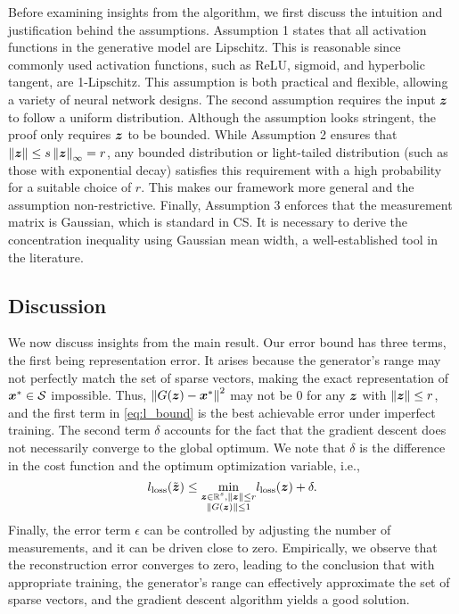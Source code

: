 \documentclass[journal]{IEEEtran}
\begin{document}
Before examining insights from the algorithm, we first discuss the intuition and justification behind the assumptions.  Assumption 1 states that all activation functions in the generative model are Lipschitz. This is reasonable since commonly used activation functions, such as ReLU, sigmoid, and hyperbolic tangent, are 1-Lipschitz. This assumption is both practical and flexible, allowing a variety of neural network designs.  The second assumption requires the input $\boldsymbol{z}$ to follow a uniform distribution. Although the assumption looks stringent, the proof only requires $\boldsymbol{z}$ to be bounded. While Assumption 2 ensures that $\left\Vert\boldsymbol{z}\right\Vert\leq s\left\Vert\boldsymbol{z}\right\Vert_{\infty}=r$, any bounded distribution or light-tailed distribution (such as those with exponential decay) satisfies this requirement with a high probability for a suitable choice of $r$. This makes our framework more general and the assumption non-restrictive.  Finally, Assumption 3 enforces that the measurement matrix is Gaussian, which is standard in CS. It is necessary to derive the concentration inequality using Gaussian mean width, a well-established tool in the literature.  

\subsection{Discussion}
We now discuss insights from the main result. Our error bound has three terms, the first being representation error. It arises because the generator’s range may not perfectly match the set of sparse vectors, making the exact representation of $\boldsymbol{x}^* \in \mathcal{S}$ impossible. Thus, $\left\Vert G(\boldsymbol{z}) - \boldsymbol{x}^* \right\Vert^2$ may not be 0 for any $\boldsymbol{z}$ with $\left\Vert\boldsymbol{z}\right\Vert \leq r$, and the first term in \eqref{eq:l_bound} is the best achievable error under imperfect training. The second term $\delta$ accounts for the fact that the gradient descent does not necessarily converge to the global optimum. We note that $\delta$ is the difference in the cost function and the optimum optimization variable, i.e., 
\begin{equation}
    l_{\mathrm{loss}}(\tilde{\boldsymbol{z}})\leq \underset{\substack{\boldsymbol{z}\in\mathbb{R}^s,\left\Vert\boldsymbol{z}\right\Vert\leq r\\\left\Vert G(\boldsymbol{z})\right\Vert\leq 1}}{\min}l_{\mathrm{loss}}(\boldsymbol{z})+ \delta.
\end{equation}
Finally, the error term $\epsilon$ can be controlled by adjusting the number of measurements, and it can be driven close to zero. Empirically, we observe that the reconstruction error converges to zero, leading to the conclusion that with appropriate training, the generator’s range can effectively approximate the set of sparse vectors, and the gradient descent algorithm yields a good solution.
\end{document}
